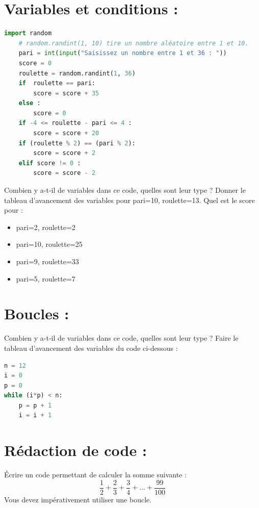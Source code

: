 \documentclass[a4paper, noanswers, addpoints, 12pt]{exam}
\begin{document}
\begin{questions}
\section{Variables et conditions : }

\begin{lstlisting}[language=Python]
    import random
    # random.randint(1, 10) tire un nombre aléatoire entre 1 et 10.
    pari = int(input("Saisissez un nombre entre 1 et 36 : "))
    score = 0
    roulette = random.randint(1, 36)
    if  roulette == pari:
        score = score + 35
    else :
        score = 0
    if -4 <= roulette - pari <= 4 :
        score = score + 20
    if (roulette % 2) == (pari % 2):
        score = score + 2
    elif score != 0 :
        score = score - 2 
\end{lstlisting}
\question[1] Combien y a-t-il de variables dans ce code, quelles sont leur type ?
\question[3] Donner le tableau d'avancement des variables pour pari=10, roulette=13.
\question[2] Quel est le score pour :
\begin{itemize}
    \item pari=2, roulette=2
    \item pari=10, roulette=25
    \item pari=9, roulette=33
    \item pari=5, roulette=7
\end{itemize}

\section{Boucles : }

\question[1] Combien y a-t-il de variables dans ce code, quelles sont leur type ?
\question[4] Faire le tableau d'avancement des variables du code ci-dessous :
\begin{lstlisting}[language=Python]
n = 12
i = 0
p = 0
while (i*p) < n:
    p = p + 1
    i = i + 1
\end{lstlisting}

\section{Rédaction de code : }
\question[3] Écrire un code permettant de calculer la somme suivante : $$\frac{1}{2} + \frac{2}{3} +\frac{3}{4} + ... + \frac{99}{100}$$ Vous devez impérativement utiliser une boucle.


\end{questions}
\end{document}
